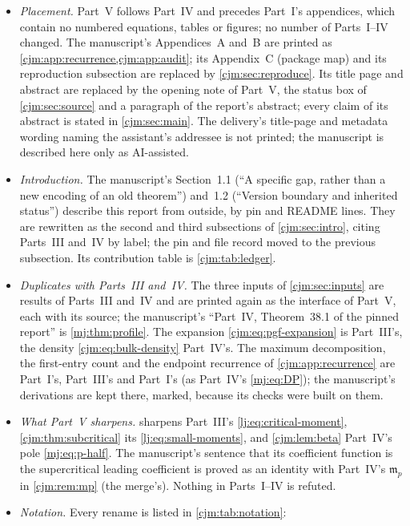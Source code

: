 \documentclass[11pt,a4paper]{article}
\theoremstyle{definition}\newaliascnt{definition}{theorem}
\theoremstyle{remark}\newaliascnt{remark}{theorem}
\begin{document}
\begin{itemize}
\item \emph{Placement.} Part~V follows Part~IV and precedes Part~I's
 appendices, which contain no numbered equations, tables or figures; no
 number of Parts~I--IV changed. The manuscript's Appendices~A and~B are
 printed as \cref{cjm:app:recurrence,cjm:app:audit}; its Appendix~C
 (package map) and its reproduction subsection are replaced by
 \cref{cjm:sec:reproduce}. Its title page and abstract are replaced by the
 opening note of Part~V, the status box of \cref{cjm:sec:source} and a
 paragraph of the report's abstract; every claim of its abstract is stated in
 \cref{cjm:sec:main}. The delivery's title-page and metadata wording naming
 the assistant's addressee is not printed; the manuscript is described here
 only as AI-assisted.
\item \emph{Introduction.} The manuscript's Section~1.1 (``A specific gap,
 rather than a new encoding of an old theorem'') and~1.2 (``Version boundary
 and inherited status'') describe this report from outside, by pin and README
 lines. They are rewritten as the second and third subsections of
 \cref{cjm:sec:intro}, citing Parts~III and~IV by label; the pin and file
 record moved to the previous subsection. Its contribution table is
 \cref{cjm:tab:ledger}.
\item \emph{Duplicates with Parts~III and~IV.} The three inputs of
 \cref{cjm:sec:inputs} are results of Parts~III and~IV and are printed again
 as the interface of Part~V, each with its source; the manuscript's
 ``Part~IV, Theorem~38.1 of the pinned report'' is \cref{mj:thm:profile}.
 The expansion \eqref{cjm:eq:pgf-expansion} is Part~III's, the density
 \eqref{cjm:eq:bulk-density} Part~IV's. The maximum decomposition, the
 first-entry count and the endpoint recurrence of \cref{cjm:app:recurrence}
 are Part~I's, Part~III's and Part~I's (as Part~IV's \eqref{mj:eq:DP});
 the manuscript's derivations are kept there, marked, because its checks
 were built on them.
\item \emph{What Part~V sharpens.}  sharpens Part~III's
 \eqref{lj:eq:critical-moment}, \cref{cjm:thm:subcritical} its
 \eqref{lj:eq:small-moments}, and \cref{cjm:lem:beta} Part~IV's pole
 \eqref{mj:eq:p-half}. The manuscript's sentence that its coefficient
 function is the supercritical leading coefficient is proved as an identity
 with Part~IV's $\mathfrak m_p$ in \cref{cjm:rem:mp} (the merge's). Nothing
 in Parts~I--IV is refuted.
\item \emph{Notation.} Every rename is listed in \cref{cjm:tab:notation}:

\end{itemize}
\end{document}

